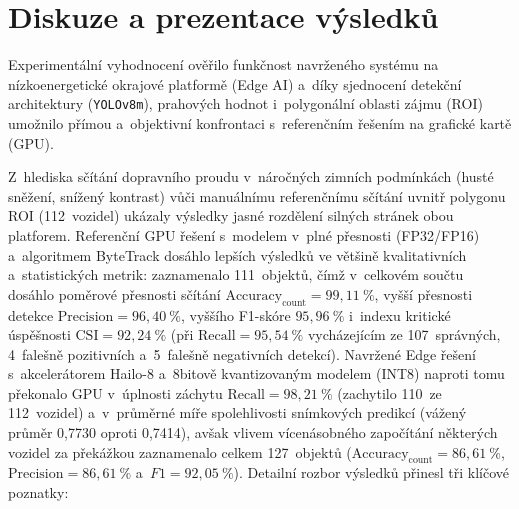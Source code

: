 \chapter{Diskuze a prezentace výsledků}
Experimentální vyhodnocení ověřilo funkčnost navrženého systému na nízkoenergetické okrajové platformě (\acs{Edge AI}) a~díky sjednocení detekční architektury (\texttt{YOLOv8m}), prahových hodnot i~polygonální oblasti zájmu (\acs{ROI}) umožnilo přímou a~objektivní konfrontaci s~referenčním řešením na grafické kartě (\acs{GPU}).

Z~hlediska sčítání dopravního proudu v~náročných zimních podmínkách (husté sněžení, snížený kontrast) vůči manuálnímu referenčnímu sčítání uvnitř polygonu ROI (112~vozidel) ukázaly výsledky jasné rozdělení silných stránek obou platforem. Referenční GPU řešení s~modelem v~plné přesnosti (FP32/FP16) a~algoritmem ByteTrack dosáhlo lepších výsledků ve většině kvalitativních a~statistických metrik: zaznamenalo 111~objektů, čímž v~celkovém součtu dosáhlo poměrové přesnosti sčítání $\text{Accuracy}_{\text{count}} = 99{,}11~\%$, vyšší přesnosti detekce $\text{Precision} = 96{,}40~\%$, vyššího F1-skóre $95{,}96~\%$ i~indexu kritické úspěšnosti $\text{CSI} = 92{,}24~\%$ (při $\text{Recall} = 95{,}54~\%$ vycházejícím ze 107~správných, 4~falešně pozitivních a~5~falešně negativních detekcí). Navržené Edge řešení s~akcelerátorem Hailo-8 a~8bitově kvantizovaným modelem (INT8) naproti tomu překonalo GPU v~úplnosti záchytu $\text{Recall} = 98{,}21~\%$ (zachytilo 110~ze 112~vozidel) a~v~průměrné míře spolehlivosti snímkových predikcí (vážený průměr 0,7730 oproti 0,7414), avšak vlivem vícenásobného započítání některých vozidel za překážkou zaznamenalo celkem 127~objektů ($\text{Accuracy}_{\text{count}} = 86{,}61~\%$, $\text{Precision} = 86{,}61~\%$ a~$F1 = 92{,}05~\%$). Detailní rozbor výsledků přinesl tři klíčové poznatky:

